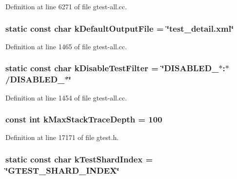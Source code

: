 \-Definition at line 6271 of file gtest-\/all.\-cc.

\hypertarget{namespacetesting_a770a114e153c518bc30b271458d7591a}{
\subsubsection[{k\-Default\-Output\-File}]{\setlength{\rightskip}{0pt plus 5cm}static const char {\bf k\-Default\-Output\-File} = \char`\"{}test\-\_\-detail.\-xml\char`\"{}}}\label{d0/d75/namespacetesting_a770a114e153c518bc30b271458d7591a}


\-Definition at line 1465 of file gtest-\/all.\-cc.

\hypertarget{namespacetesting_a838f9d2c93a072f193aeb34809047179}{
\subsubsection[{k\-Disable\-Test\-Filter}]{\setlength{\rightskip}{0pt plus 5cm}static const char {\bf k\-Disable\-Test\-Filter} = \char`\"{}\-D\-I\-S\-A\-B\-L\-E\-D\-\_\-$\ast$\-:$\ast$/\-D\-I\-S\-A\-B\-L\-E\-D\-\_\-$\ast$\char`\"{}}}\label{d0/d75/namespacetesting_a838f9d2c93a072f193aeb34809047179}


\-Definition at line 1454 of file gtest-\/all.\-cc.

\hypertarget{namespacetesting_af923b7f5ce597d321ccd3f7e62afb270}{
\subsubsection[{k\-Max\-Stack\-Trace\-Depth}]{\setlength{\rightskip}{0pt plus 5cm}const int {\bf k\-Max\-Stack\-Trace\-Depth} = 100}}\label{d0/d75/namespacetesting_af923b7f5ce597d321ccd3f7e62afb270}


\-Definition at line 17171 of file gtest.\-h.

\hypertarget{namespacetesting_a34e170fdd4ba4d2f80456cc37e2a8185}{
\subsubsection[{k\-Test\-Shard\-Index}]{\setlength{\rightskip}{0pt plus 5cm}static const char {\bf k\-Test\-Shard\-Index} = \char`\"{}\-G\-T\-E\-S\-T\-\_\-\-S\-H\-A\-R\-D\-\_\-\-I\-N\-D\-E\-X\char`\"{}}}\label{d0/d75/namespacetesting_a34e170fdd4ba4d2f80456cc37e2a8185}



